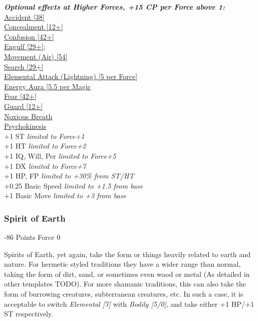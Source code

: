 \begin{multicols*}{3}
	\textbf{\textit{Optional effects at Higher Forces, +15 CP per Force above 1:\\}}
	\hyperref[accident]{Accident [38]}\\
	\hyperref[concealment]{Concealment [12+]}\\
	\hyperref[confusion]{Confusion [42+]}\\
	\hyperref[engulf]{Engulf [29+];}\\
	\hyperref[movement]{Movement (Air) [54]}\\
	\hyperref[search]{Search [29+]}\\
	\hyperref[elemental_attack]{Elemental Attack (Lightning) [5 per Force]}\\
	\hyperref[energy_aura]{Energy Aura [5.5 per Magic}\\
	\hyperref[fear]{Fear [42+]}\\
	\hyperref[guard]{Guard [12+]}\\
	\hyperref[noxious_breath]{Noxious Breath}\\
	\hyperref[psychokinesis]{Psychokinesis}\\
	
	+1 ST \textit{limited to Force+1}\\
	+1 HT \textit{limited to Force+2}\\
	+1 IQ, Will, Per \textit{limited to Force+5}\\
	+1 DX \textit{limited to Force+7}\\
	+1 HP, FP \textit{limited to +30\% from ST/HT}\\
	+0.25 Basic Speed \textit{limited to +1.5 from base}\\
	+1 Basic Move \textit{limited to +3 from base}\\
	
	
	\subsubsection{Spirit of Earth}
	\begin{flushright}
		-86 Points Force 0
	\end{flushright}
	
	Spirits of Earth, yet again, take the form or things heavily related to earth and nature. For hermetic styled traditions they have a wider range than normal, taking the form of dirt, sand, or sometimes even wood or metal (As detailed in other templates TODO). For more shamanic traditions, this can also take the form of burrowing creatures, subterranean creatures, etc. In such a case, it is acceptable to switch \textit{Elemental [7]} with \textit{Bodily [5/0]}, and take either +1 HP/+1 ST respectively.
	

\end{multicols*}
